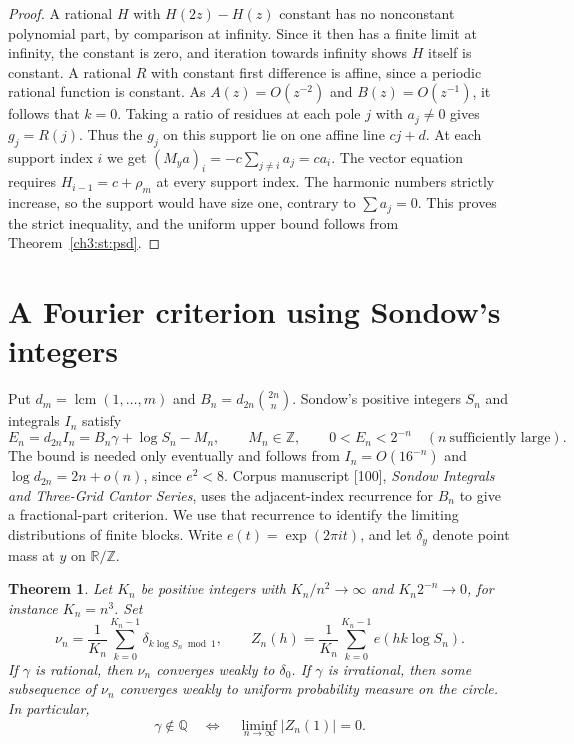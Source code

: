 \documentclass[11pt,a4paper,oneside,openany]{report}
\newtheorem{theorem}{Theorem}[section]
\theoremstyle{remark}\newtheorem{remark}[theorem]{Remark}
\numberwithin{equation}{section}
\begin{document}
\begin{proof}
A rational $H$ with $H(2z)-H(z)$ constant has no nonconstant
polynomial part, by comparison at infinity. Since it then has a finite
limit at infinity, the constant is zero, and iteration towards infinity
shows $H$ itself is constant. A rational $R$ with constant first
difference is affine, since a periodic rational function is constant.
As $A(z)=O(z^{-2})$ and $B(z)=O(z^{-1})$, it follows that $k=0$.
Taking a ratio of residues at each pole $j$ with $a_j\ne0$ gives
$g_j=R(j)$. Thus the $g_j$ on this support lie on one affine line
$cj+d$. At each support index $i$ we get
$(M_y a)_i=-c\sum_{j\ne i}a_j=c a_i$.
The vector equation requires $H_{i-1}=c+\rho_m$ at every support
index. The harmonic numbers strictly increase, so the support would
have size one, contrary to $\sum a_j=0$. This proves the strict
inequality, and the uniform upper bound follows from
Theorem~\ref{ch3:st:psd}.

\end{proof}

\section{A Fourier criterion using Sondow's integers}
\label{ch3:r3:sondow-spectrum}

Put $d_m=\operatorname{lcm}(1,\ldots,m)$ and
$B_n=d_{2n}\binom{2n}{n}$. Sondow's positive integers $S_n$ and
integrals $I_n$ satisfy \cite{sondow}
\[
 E_n=d_{2n}I_n=B_n\gamma+\log S_n-M_n,\qquad
 M_n\in\mathbb Z,\qquad 0<E_n<2^{-n}\quad(n\ \text{sufficiently large}).
\]
The bound is needed only eventually and follows from $I_n=O(16^{-n})$ and $\log d_{2n}=2n+o(n)$, since $e^2<8$.
Corpus manuscript [100], \emph{Sondow Integrals and Three-Grid
Cantor Series}, uses the adjacent-index recurrence for $B_n$ to give
a fractional-part criterion. We use that recurrence to identify the
limiting distributions of finite blocks. Write $e(t)=\exp(2\pi i t)$,
and let $\delta_y$ denote point mass at $y$ on $\mathbb R/\mathbb Z$.

\begin{theorem}
Let $K_n$ be positive integers with $K_n/n^2\to\infty$ and
$K_n2^{-n}\to0$, for instance $K_n=n^3$. Set
\[
 \nu_n=\frac1{K_n}\sum_{k=0}^{K_n-1}\delta_{k\log S_n\bmod 1},
 \qquad Z_n(h)=\frac1{K_n}\sum_{k=0}^{K_n-1}e(hk\log S_n).
\]
If $\gamma$ is rational, then $\nu_n$ converges weakly to $\delta_0$.
If $\gamma$ is irrational, then some subsequence of $\nu_n$ converges
weakly to uniform probability measure on the circle. In particular,
\[
 \gamma\notin\mathbb Q\quad\Longleftrightarrow\quad
 \liminf_{n\to\infty}|Z_n(1)|=0.
\]
\end{theorem}
\end{document}
